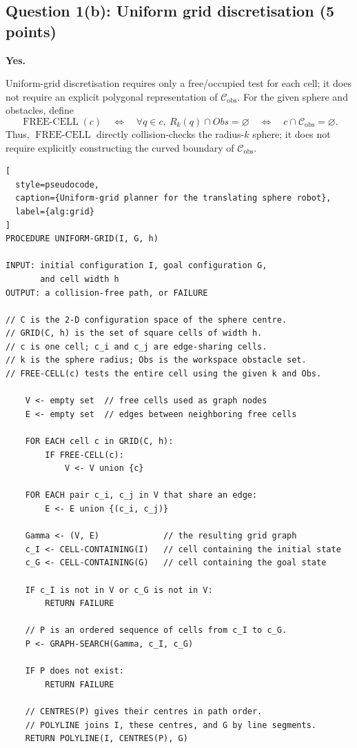 \documentclass[11pt,a4paper]{article}
\begin{document}
\clearpage
\subsection*{Question 1(b): Uniform grid discretisation (5 points)}

\noindent\textbf{Yes.}

\noindent
Uniform-grid discretisation requires only a free/occupied test for each cell;
it does not require an explicit polygonal representation of
$\mathcal{C}_{\mathrm{obs}}$.  For the given sphere and obstacles, define
\[
  \operatorname{FREE\text{-}CELL}(c)
  \quad\Longleftrightarrow\quad
  \forall q\in c,\ R_k(q)\cap Obs=\varnothing
  \quad\Longleftrightarrow\quad
  c\cap\mathcal{C}_{\mathrm{obs}}=\varnothing.
\]
Thus, $\operatorname{FREE\text{-}CELL}$ directly collision-checks the
radius-$k$ sphere; it does not require explicitly constructing the curved
boundary of $\mathcal{C}_{\mathrm{obs}}$.

\begin{lstlisting}[
  style=pseudocode,
  caption={Uniform-grid planner for the translating sphere robot},
  label={alg:grid}
]
PROCEDURE UNIFORM-GRID(I, G, h)

INPUT: initial configuration I, goal configuration G,
       and cell width h
OUTPUT: a collision-free path, or FAILURE

// C is the 2-D configuration space of the sphere centre.
// GRID(C, h) is the set of square cells of width h.
// c is one cell; c_i and c_j are edge-sharing cells.
// k is the sphere radius; Obs is the workspace obstacle set.
// FREE-CELL(c) tests the entire cell using the given k and Obs.

    V <- empty set  // free cells used as graph nodes
    E <- empty set  // edges between neighboring free cells

    FOR EACH cell c in GRID(C, h):
        IF FREE-CELL(c):
            V <- V union {c}

    FOR EACH pair c_i, c_j in V that share an edge:
        E <- E union {(c_i, c_j)}

    Gamma <- (V, E)             // the resulting grid graph
    c_I <- CELL-CONTAINING(I)   // cell containing the initial state
    c_G <- CELL-CONTAINING(G)   // cell containing the goal state

    IF c_I is not in V or c_G is not in V:
        RETURN FAILURE

    // P is an ordered sequence of cells from c_I to c_G.
    P <- GRAPH-SEARCH(Gamma, c_I, c_G)

    IF P does not exist:
        RETURN FAILURE

    // CENTRES(P) gives their centres in path order.
    // POLYLINE joins I, these centres, and G by line segments.
    RETURN POLYLINE(I, CENTRES(P), G)
\end{lstlisting}
\end{document}
